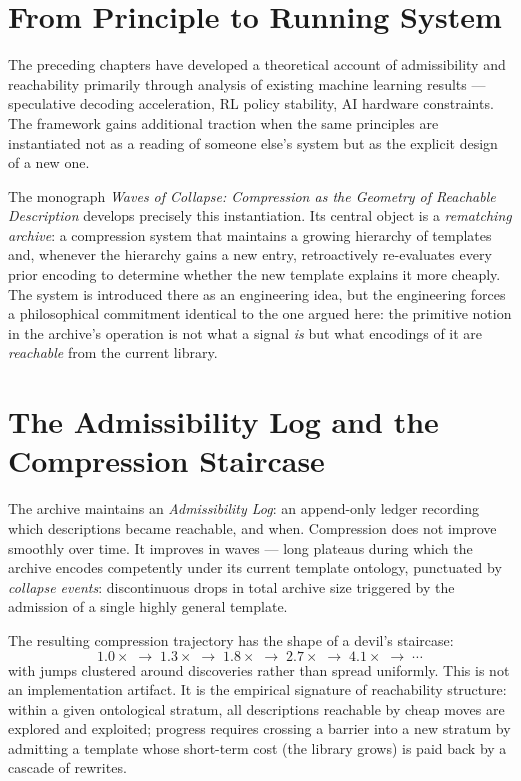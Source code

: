 \documentclass[11pt, a4paper, openany]{book}
\theoremstyle{plain}
\theoremstyle{definition}
\theoremstyle{remark}
\begin{document}
\section{From Principle to Running System}

The preceding chapters have developed a theoretical account of admissibility and reachability
primarily through analysis of existing machine learning results --- speculative decoding
acceleration, RL policy stability, AI hardware constraints.
The framework gains additional traction when the same principles are instantiated
not as a reading of someone else's system but as the explicit design of a new one.

The monograph \emph{Waves of Collapse: Compression as the Geometry of Reachable
Description} \cite{flyxion2026waves} develops precisely this instantiation.
Its central object is a \emph{rematching archive}: a compression system that maintains
a growing hierarchy of templates and, whenever the hierarchy gains a new entry,
retroactively re-evaluates every prior encoding to determine whether the new template
explains it more cheaply.
The system is introduced there as an engineering idea, but the engineering
forces a philosophical commitment identical to the one argued here:
the primitive notion in the archive's operation is not what a signal \emph{is}
but what encodings of it are \emph{reachable} from the current library.

\section{The Admissibility Log and the Compression Staircase}

The archive maintains an \emph{Admissibility Log}: an append-only ledger recording which
descriptions became reachable, and when.
Compression does not improve smoothly over time.
It improves in waves --- long plateaus during which the archive encodes competently
under its current template ontology, punctuated by \emph{collapse events}:
discontinuous drops in total archive size triggered by the admission of a single
highly general template.

The resulting compression trajectory has the shape of a devil's staircase:
\[
  1.0\times \;\to\; 1.3\times \;\to\; 1.8\times \;\to\; 2.7\times \;\to\; 4.1\times \;\to\; \cdots
\]
with jumps clustered around discoveries rather than spread uniformly.
This is not an implementation artifact.
It is the empirical signature of reachability structure:
within a given ontological stratum, all descriptions reachable by cheap moves
are explored and exploited;
progress requires crossing a barrier into a new stratum by admitting a template
whose short-term cost (the library grows) is paid back by a cascade of rewrites.
\end{document}
